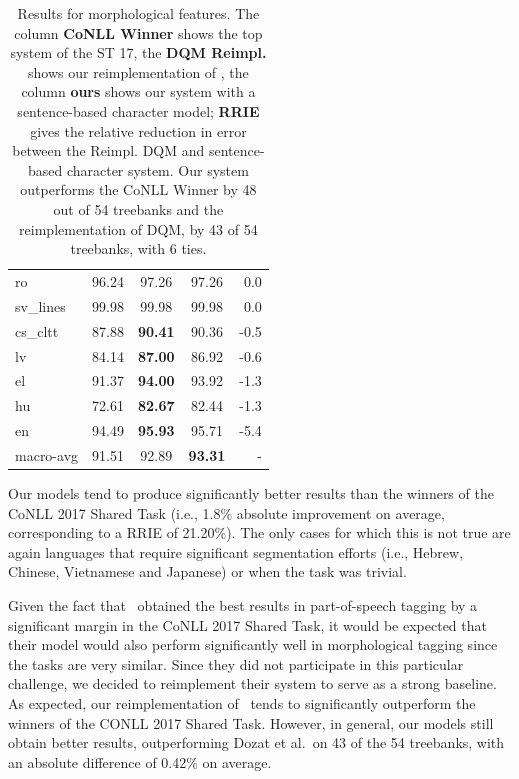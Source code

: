 \documentclass[11pt,a4paper]{article}
\newcommand\emily[1]{\textcolor{cyan}{[EP: #1]}}
\begin{document}
\begin{table}[]
\begin{center}
\begin{tabular}{|l|c||c|c|r|}
ro           &     96.24  &     97.26    &  97.26 &   0.0\\
sv\_lines    &  99.98  &  99.98    &  99.98 &     0.0\\
cs\_cltt     &     87.88  & \bf  90.41    &  90.36 &    -0.5\\
lv           &     84.14  & \bf  87.00    &  86.92 &     -0.6\\
el           &     91.37  & \bf  94.00    &  93.92 &    -1.3\\
hu           &     72.61  & \bf 82.67    &     82.44 &  -1.3\\
en           &     94.49  & \bf 95.93    &     95.71 &  -5.4\\
\hline
macro-avg    & 91.51      &     92.89    &\bf  93.31 & - \\\hline
\end{tabular}
\end{center}
\caption{\label{table:morphology-results} Results for morphological features. The column \textbf{CoNLL Winner} shows the top system of the ST 17, the \textbf{DQM Reimpl.} shows our reimplementation of , the column \textbf{ours} shows our system with a sentence-based character model; \textbf{RRIE} gives the relative reduction in error between the Reimpl. DQM and sentence-based character system. Our system outperforms the CoNLL Winner by 48 out of 54 treebanks and the reimplementation of DQM, by 43 of 54 treebanks, with 6 ties. 
}
\end{table}

Our models tend to produce significantly better results than the winners of the CoNLL 2017 Shared Task (i.e., 1.8\% absolute improvement on average, corresponding to a RRIE of 21.20\%). The only cases for which this is not true are again languages that require significant segmentation efforts (i.e., Hebrew, Chinese, Vietnamese and Japanese) or when the task was trivial.

Given the fact that~ obtained the best results in part-of-speech tagging by a significant margin in the CoNLL 2017 Shared Task, it would be expected that their model would also perform significantly well in morphological tagging since the tasks are very similar. Since they did not participate in this particular challenge, we decided to reimplement their system to serve as a strong baseline. 
As expected, our reimplementation of~ tends to significantly outperform the winners of the CONLL 2017 Shared Task. However, in general, our models still obtain better results, outperforming Dozat et al.\ on 43 of the 54 treebanks, with an absolute difference of 0.42\% on average.
\end{document}
